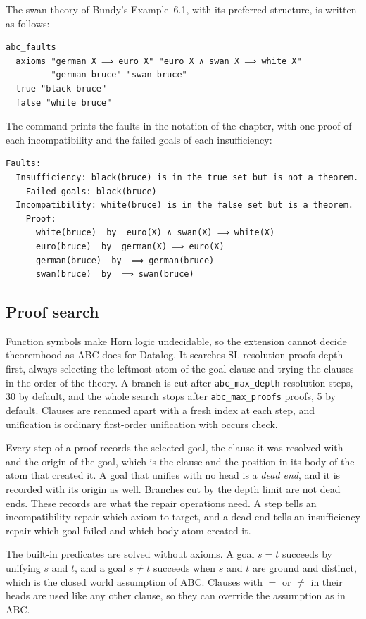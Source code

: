 \documentclass[preprint,12pt]{elsarticle}
\newcommand{\isa}[1]{\texttt{#1}}
\begin{document}
The swan theory of Bundy's Example~6.1, with its preferred structure, is
written as follows:
\begin{lstlisting}
abc_faults
  axioms "german X ⟹ euro X" "euro X ∧ swan X ⟹ white X"
         "german bruce" "swan bruce"
  true "black bruce"
  false "white bruce"
\end{lstlisting}
The command prints the faults in the notation of the chapter, with one
proof of each incompatibility and the failed goals of each insufficiency:
\begin{lstlisting}[language=Out]
Faults:
  Insufficiency: black(bruce) is in the true set but is not a theorem.
    Failed goals: black(bruce)
  Incompatibility: white(bruce) is in the false set but is a theorem.
    Proof:
      white(bruce)  by  euro(X) ∧ swan(X) ⟹ white(X)
      euro(bruce)  by  german(X) ⟹ euro(X)
      german(bruce)  by  ⟹ german(bruce)
      swan(bruce)  by  ⟹ swan(bruce)
\end{lstlisting}

\subsection{Proof search}
\label{sec:proofs}

Function symbols make Horn logic undecidable, so the extension cannot
decide theoremhood as ABC does for Datalog. It searches SL resolution
proofs depth first, always selecting the leftmost atom of the goal clause
and trying the clauses in the order of the theory. A branch is cut after
\isa{abc\_max\_depth} resolution steps, 30 by default, and the whole search
stops after \isa{abc\_max\_proofs} proofs, 5 by default. Clauses are
renamed apart with a fresh index at each step, and unification is ordinary
first-order unification with occurs check.

Every step of a proof records the selected goal, the clause it was resolved
with and the origin of the goal, which is the clause and the position in
its body of the atom that created it. A goal that unifies with no head is a
\emph{dead end}, and it is recorded with its origin as well. Branches cut
by the depth limit are not dead ends. These records are what the repair
operations need. A step tells an incompatibility repair which axiom to
target, and a dead end tells an insufficiency repair which goal failed and
which body atom created it.

The built-in predicates are solved without axioms. A goal $s = t$ succeeds
by unifying $s$ and $t$, and a goal $s \neq t$ succeeds when $s$ and $t$
are ground and distinct, which is the closed world assumption of ABC.
Clauses with $=$ or $\neq$ in their heads are used like any other clause,
so they can override the assumption as in ABC.
\end{document}
